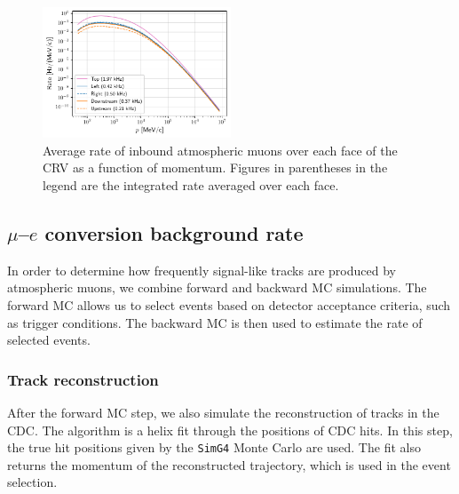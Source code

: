 \begin{figure}
    \centering
    \includegraphics[width=0.5\textwidth]{chapter5/rate_vs_p.pdf}
    \caption{
        Average rate of inbound atmospheric muons over each face of the CRV as a
        function of momentum. Figures in parentheses in the legend are the
        integrated rate averaged over each face.
    }
    \label{fig:avg_rate_per_face}
\end{figure}

\subsection{\texorpdfstring{$\mu$--$e$}{Muon-to-electron} conversion background
rate}
\label{sec:bmc_conversion_bg_rate}
In order to determine how frequently signal-like tracks are produced by
atmospheric muons, we combine forward and backward MC simulations. The forward
MC allows us to select events based on detector acceptance criteria, such as
trigger conditions. The backward MC is then used to estimate the rate of
selected events.

\subsubsection{Track reconstruction}
After the forward MC step, we also simulate the reconstruction of tracks in the
CDC. The algorithm is a helix fit through the positions of CDC hits. In this step,
the true hit positions given by the \texttt{SimG4} Monte Carlo are used. The fit
also returns the momentum of the reconstructed trajectory, which is used in the
event selection.


